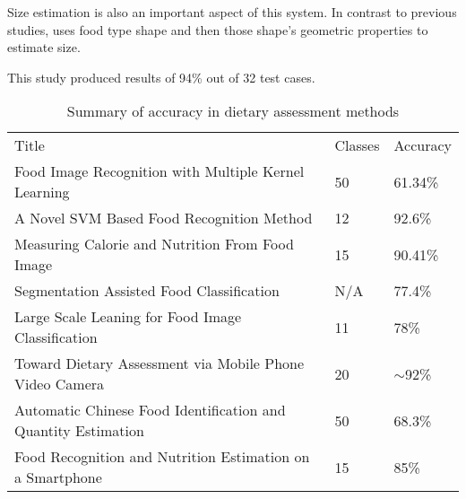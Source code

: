 Size estimation is also an important aspect of this system.
In contrast to previous studies, \textcite{snap} uses food type shape and then those shape's geometric properties to estimate size.

This study produced results of 94\% out of 32 test cases.


\begin{table}[]
\centering
\caption{Summary of accuracy in dietary assessment methods}
\label{other_dietary_summary}
\begin{tabular}{lll}
Title                                                         & Classes & Accuracy   \\
Food Image Recognition with Multiple Kernel Learning          & 50             & 61.34\%    \\
A Novel SVM Based Food Recognition Method                     & 12             & 92.6\%     \\
Measuring Calorie and Nutrition From Food Image               & 15             & 90.41\%    \\
Segmentation Assisted Food Classification                     & N/A            & 77.4\%     \\
Large Scale Leaning for Food Image Classification             & 11             & 78\%       \\
Toward Dietary Assessment via Mobile Phone Video Camera       & 20             & $\sim$92\% \\
Automatic Chinese Food Identification and Quantity Estimation & 50             & 68.3\%     \\
Food Recognition and Nutrition Estimation on a Smartphone      & 15             & 85\%      
\end{tabular}
\end{table}